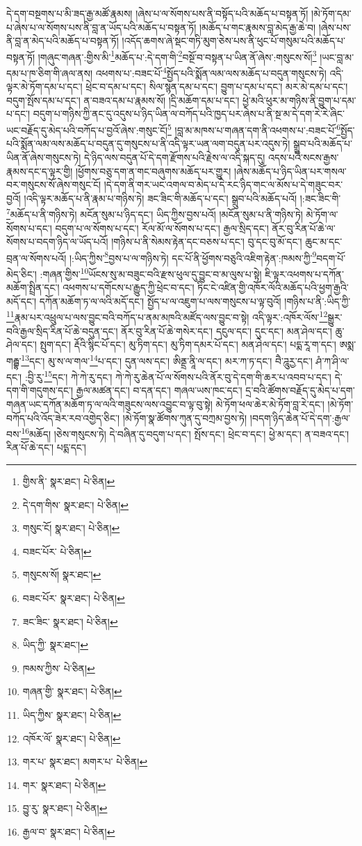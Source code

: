 དེ་དག་བསྔགས་པ་མི་ཟད་རྒྱ་མཚོ་རྣམས། །ཞེས་པ་ལ་སོགས་པས་ནི་བསྟོད་པའི་མཆོད་པ་བསྟན་ཏོ། །མེ་ཏོག་དམ་པ་ཞེས་པ་ལ་སོགས་པས་ནི་བླ་ན་ཡོད་པའི་མཆོད་པ་བསྟན་ཏོ། །མཆོད་པ་གང་རྣམས་བླ་མེད་རྒྱ་ཆེ་བ། །ཞེས་པས་ནི་བླ་ན་མེད་པའི་མཆོད་པ་བསྟན་ཏོ། །འདོད་ཆགས་ཞེ་སྡང་གཏི་མུག་ཅེས་པས་ནི་ཕུང་པོ་གསུམ་པའི་མཆོད་པ་བསྟན་ཏོ། །གཞུང་གཞན་:གྱིས་མི་\footnote{གྱིས་ནི་  སྣར་ཐང་།  པེ་ཅིན། }མཆོད་པ་:དེ་དག་གི་\footnote{དེ་དག་གིས་  སྣར་ཐང་།  པེ་ཅིན། }བསྔོ་བ་བསྟན་པ་ཡིན་ནོ་ཞེས་:གསུངས་སོ།\footnote{གསུང་ངོ།  སྣར་ཐང་།  པེ་ཅིན། } །ཡང་བླ་མ་དམ་པ་ཁ་ཅིག་གི་ཞལ་ནས། འཕགས་པ་:བཟང་པོ་\footnote{བཟང་པོར་  པེ་ཅིན། }སྤྱོད་པའི་སྨོན་ལམ་ལས་མཆོད་པ་བདུན་གསུངས་ཏེ། འདི་ལྟར་མེ་ཏོག་དམ་པ་དང་། ཕྲེང་བ་དམ་པ་དང་། སིལ་སྙན་དམ་པ་དང་། བྱུག་པ་དམ་པ་དང་། མར་མེ་དམ་པ་དང་། བདུག་སྤོས་དམ་པ་དང་། ན་བཟའ་དམ་པ་རྣམས་སོ། །དྲི་མཆོག་དམ་པ་དང་། ཕྱེ་མའི་ཕུར་མ་གཉིས་ནི་བྱུག་པ་དམ་པ་དང་། བདུག་པ་གཉིས་ཀྱི་ནང་དུ་འདུས་པ་ཉིད་ཡིན་ལ་བཀོད་པའི་ཁྱད་པར་ཞེས་པ་ནི་སྔ་མ་དེ་དག་རེ་རེ་ཞིང་ཡང་བརྗོད་དུ་མེད་པའི་བཀོད་པ་བྱའོ་ཞེས་:གསུང་ངོ།\footnote{གསུངས་སོ།  སྣར་ཐང་། } །བླ་མ་མཁས་པ་གཞན་དག་ནི་འཕགས་པ་:བཟང་པོ་\footnote{བཟང་པོར་  སྣར་ཐང་།  པེ་ཅིན། }སྤྱོད་པའི་སྨོན་ལམ་ལས་མཆོད་པ་བདུན་དུ་གསུངས་པ་ནི་འདི་ལྟར་ཡན་ལག་བདུན་པར་འདུས་ཏེ། སྒྲུབ་པའི་མཆོད་པ་ཡིན་ནོ་ཞེས་གསུངས་ཏེ། དེ་ཉིད་ལས་བདུན་པོ་དེ་དག་རྫོགས་པའི་རྗེས་ལ་འདི་སྐད་དུ། འདས་པའི་སངས་རྒྱས་རྣམས་དང་ད་ལྟར་གྱི། །ཕྱོགས་བཅུ་དག་ན་གང་བཞུགས་མཆོད་པར་གྱུར། །ཞེས་མཆོད་པ་ཉིད་ཡིན་པར་གསལ་བར་གསུངས་སོ་ཞེས་གསུང་ངོ། །དེ་དག་ནི་གར་ཡང་འགལ་བ་མེད་པ་དེ་རང་ཉིད་གང་ལ་མོས་པ་དེ་གཟུང་བར་བྱའོ། །འདི་ལྟར་མཆོད་པ་ནི་རྣམ་པ་གཉིས་ཏེ། ཟང་ཟིང་གི་མཆོད་པ་དང་། སྒྲུབ་པའི་མཆོད་པའོ། །:ཟང་ཟིང་གི་\footnote{ཟང་ཟིང་  སྣར་ཐང་།  པེ་ཅིན། }མཆོད་པ་ནི་གཉིས་ཏེ། མངོན་སུམ་པ་ཉིད་དང་། ཡིད་ཀྱིས་བྱས་པའོ། །མངོན་སུམ་པ་ནི་གཉིས་ཏེ། མེ་ཏོག་ལ་སོགས་པ་དང་། བདུག་པ་ལ་སོགས་པ་དང་། རོལ་མོ་ལ་སོགས་པ་དང་། རྒྱལ་སྲིད་དང་། ནོར་བུ་རིན་པོ་ཆེ་ལ་སོགས་པ་བདག་ཉིད་ལ་ཡོད་པའོ། །གཉིས་པ་ནི་སེམས་རྟེན་དང་བཅས་པ་དང་། བུ་དང་བུ་མོ་དང་། ཆུང་མ་དང་བྲན་ལ་སོགས་པའོ། །:ཡིད་ཀྱིས་\footnote{ཡིད་ཀྱི་  སྣར་ཐང་། }བྱས་པ་ལ་གཉིས་ཏེ། དང་པོ་ནི་ཕྱོགས་བཅུའི་འཇིག་རྟེན་:ཁམས་ཀྱི་\footnote{ཁམས་ཀྱིས་  པེ་ཅིན། }བདག་པོ་མེད་ཅིང་། :གཞན་གྱིས་\footnote{གཞན་གྱི་  སྣར་ཐང་།  པེ་ཅིན། }ཡོངས་སུ་མ་བཟུང་བའི་རྫས་ཕུལ་དུ་བྱུང་བ་མ་ལུས་པ་སྟེ། ཇི་ལྟར་འཕགས་པ་དཀོན་མཆོག་སྤྲིན་དང་། འཕགས་པ་དགོངས་པ་རྒྱུད་ཀྱི་ཕྲེང་བ་དང་། ཏིང་ངེ་འཛིན་གྱི་འཁོར་ལོའི་མཆོད་པའི་ཕྱག་རྒྱའི་མདོ་དང་། དཀོན་མཆོག་ཏ་ལ་ལའི་མདོ་དང་། སྤྱོད་པ་ལ་འཇུག་པ་ལས་གསུངས་པ་ལྟ་བུའོ། །གཉིས་པ་ནི་:ཡིད་ཀྱི་\footnote{ཡིད་ཀྱིས་  སྣར་ཐང་།  པེ་ཅིན། }རྣམ་པར་འཕྲུལ་པ་ལས་བྱུང་བའི་བཀོད་པ་ནམ་མཁའི་མཛོད་ལས་བྱུང་བ་སྟེ། འདི་ལྟར་:འཁོར་ལོས་\footnote{འཁོར་ལོ་  སྣར་ཐང་།  པེ་ཅིན། }སྒྱུར་བའི་རྒྱལ་སྲིད་རིན་པོ་ཆེ་བདུན་དང་། ནོར་བུ་རིན་པོ་ཆེ་གསེར་དང་། དངུལ་དང་། དུང་དང་། མན་ཤེལ་དང་། ཆུ་ཤེལ་དང་། སྤུག་དང་། རྡོའི་སྙིང་པོ་དང་། མུ་ཏིག་དང་། མུ་ཏིག་དམར་པོ་དང་། མན་ཤེལ་དང་། པདྨ་རཱ་ག་དང་། ཨསྨ་གརྦྷ་\footnote{གར་པ་  སྣར་ཐང་། མགར་པ་  པེ་ཅིན། }དང་། མུ་ས་ལ་གལ་\footnote{གར་  སྣར་ཐང་།  པེ་ཅིན། }པ་དང་། དུན་ལས་དང་། ཨིནྡྲ་ནཱི་ལ་དང་། མར་ཀ་ཏ་དང་། བཻ་ཌཱུརྱ་དང་། ཤཾ་ཀ་ཤི་ལ་དང་། :བྱི་རུ་\footnote{བྱུ་རུ་  སྣར་ཐང་།  པེ་ཅིན། }དང་། ཀེ་ཀེ་རུ་དང་། ཀེ་ཀེ་རུ་ཆེན་པོ་ལ་སོགས་པའི་ནོར་བུ་དེ་དག་གི་ཆར་པ་འབབ་པ་དང་། དེ་དག་གི་གདུགས་དང་། རྒྱལ་མཚན་དང་། བ་དན་དང་། གཞལ་ཡས་ཁང་དང་། དྲ་བའི་ཚོགས་བརྗོད་དུ་མེད་པ་དག་གཞན་ཡང་དཀོན་མཆོག་ཏ་ལ་ལའི་གཟུངས་ལས་འབྱུང་བ་ལྟ་བུ་སྟེ། མེ་ཏོག་ཕལ་ཆེར་མེ་ཏོག་བླ་རེ་དང་། །མེ་ཏོག་བཀོད་པའི་འོད་ཟེར་རབ་འགྱེད་ཅིང་། །མེ་ཏོག་སྣ་ཚོགས་ཀུན་དུ་བཀྲམ་བྱས་ཏེ། །བདག་ཉིད་ཆེན་པོ་དེ་དག་:རྒྱལ་བས་\footnote{རྒྱལ་བ་  སྣར་ཐང་།  པེ་ཅིན། }མཆོད། །ཅེས་གསུངས་ཏེ། དེ་བཞིན་དུ་བདུག་པ་དང་། སྤོས་དང་། ཕྲེང་བ་དང་། ཕྱེ་མ་དང་། ན་བཟའ་དང་། རིན་པོ་ཆེ་དང་། པདྨ་དང་། 
